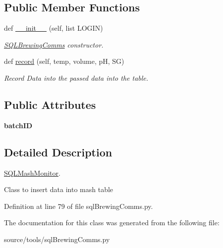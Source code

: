 \subsection*{Public Member Functions}
\begin{DoxyCompactItemize}
\item 
\mbox{\label{classsql_brewing_comms_1_1_s_q_l_mash_monitor_aca0807fc6626e62905eade09aa8431ff}} 
def \mbox{\hyperlink{classsql_brewing_comms_1_1_s_q_l_mash_monitor_aca0807fc6626e62905eade09aa8431ff}{\+\_\+\+\_\+init\+\_\+\+\_\+}} (self, list L\+O\+G\+IN)
\begin{DoxyCompactList}\small\item\em \mbox{\hyperlink{classsql_brewing_comms_1_1_s_q_l_brewing_comms}{S\+Q\+L\+Brewing\+Comms}} constructor. \end{DoxyCompactList}\item 
\mbox{\label{classsql_brewing_comms_1_1_s_q_l_mash_monitor_ad9093bc5b0488a11e38420dede8cbf67}} 
def \mbox{\hyperlink{classsql_brewing_comms_1_1_s_q_l_mash_monitor_ad9093bc5b0488a11e38420dede8cbf67}{record}} (self, temp, volume, pH, SG)
\begin{DoxyCompactList}\small\item\em Record Data into the passed data into the table. \end{DoxyCompactList}\end{DoxyCompactItemize}
\subsection*{Public Attributes}
\begin{DoxyCompactItemize}
\item 
\mbox{\label{classsql_brewing_comms_1_1_s_q_l_mash_monitor_a01f7a8e07f6e1f57fb9f8725757d3b8b}} 
{\bfseries batch\+ID}
\end{DoxyCompactItemize}


\subsection{Detailed Description}
\mbox{\hyperlink{classsql_brewing_comms_1_1_s_q_l_mash_monitor}{S\+Q\+L\+Mash\+Monitor}}. 

Class to insert data into mash table 

Definition at line 79 of file sql\+Brewing\+Comms.\+py.



The documentation for this class was generated from the following file\+:\begin{DoxyCompactItemize}
\item 
source/tools/sql\+Brewing\+Comms.\+py\end{DoxyCompactItemize}

